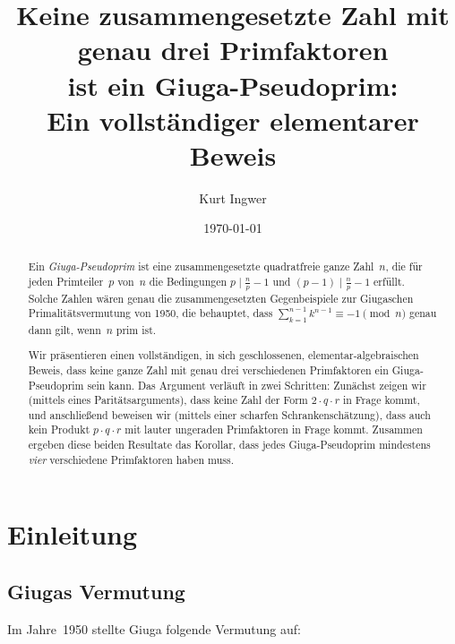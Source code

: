 \documentclass[12pt,a4paper]{amsart}
\theoremstyle{definition}
\begin{document}

\title{Keine zusammengesetzte Zahl mit genau drei Primfaktoren\\
       ist ein Giuga-Pseudoprim:\\
       Ein vollständiger elementarer Beweis}

\author{Kurt Ingwer}
\address{Specialist Mathematics Project, Version Build 43}
\date{\today}

\begin{abstract}
Ein \emph{Giuga-Pseudoprim} ist eine zusammengesetzte quadratfreie ganze Zahl~$n$,
die für jeden Primteiler~$p$ von~$n$ die Bedingungen
$p \mid \tfrac{n}{p} - 1$ und $(p-1) \mid \tfrac{n}{p} - 1$ erfüllt.
Solche Zahlen wären genau die zusammengesetzten Gegenbeispiele zur Giugaschen
Primalitätsvermutung von 1950, die behauptet, dass
$\sum_{k=1}^{n-1} k^{n-1} \equiv -1 \pmod{n}$ genau dann gilt, wenn~$n$ prim ist.

Wir präsentieren einen vollständigen, in sich geschlossenen, elementar-algebraischen
Beweis, dass keine ganze Zahl mit genau drei verschiedenen Primfaktoren ein
Giuga-Pseudoprim sein kann. Das Argument verläuft in zwei Schritten: Zunächst
zeigen wir (mittels eines Paritätsarguments), dass keine Zahl der Form $2 \cdot q \cdot r$
in Frage kommt, und anschließend beweisen wir (mittels einer scharfen Schrankenschätzung),
dass auch kein Produkt $p \cdot q \cdot r$ mit lauter ungeraden Primfaktoren in Frage
kommt. Zusammen ergeben diese beiden Resultate das Korollar, dass jedes
Giuga-Pseudoprim mindestens \emph{vier} verschiedene Primfaktoren haben muss.
\end{abstract}

\maketitle

\section{Einleitung}

\subsection{Giugas Vermutung}

Im Jahre~1950 stellte Giuga \cite{Giuga1950} folgende Vermutung auf:
\end{document}
